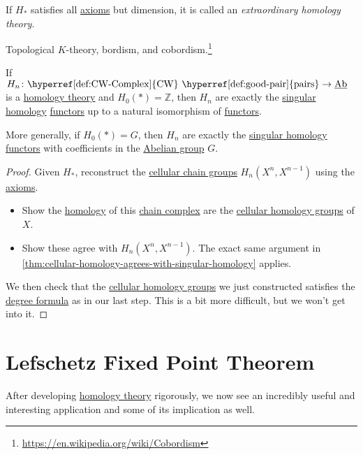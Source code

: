 \begin{definition}\label{def:extraordinary-homology-theory}
	If \(H_\ast\) satisfies all \hyperref[def:homology-theory]{axioms} but dimension, it is called an \emph{extraordinary homology theory}.
\end{definition}
\begin{eg}
	Topological \(K\)-theory, bordism, and cobordism.\footnote{\url{https://en.wikipedia.org/wiki/Cobordism}}
\end{eg}

\begin{theorem}\label{thm:characterization-of-singular-homology}
	If \(H_n \colon \text{\hyperref[def:CW-Complex]{CW} \hyperref[def:good-pair]{pairs}} \to \underline{\mathrm{Ab}}\) is a
	\hyperref[def:homology-theory]{homology theory} and \(H_0(\ast) = \mathbb{Z}\), then \(H_n\) are exactly
	the \hyperref[def:singular-homology-group]{singular homology} \hyperref[def:functor]{functors} up to a natural isomorphism of \hyperref[def:functor]{functors}.

	More generally, if \(H_0(\ast) = G\), then \(H_n\) are exactly the
	\hyperref[def:singular-homology-group]{singular homology} \hyperref[def:functor]{functors} with coefficients in the
	\hyperref[def:Abelian-group]{Abelian group} \(G\).
\end{theorem}
\begin{proof}
	Given \(H_\ast\), reconstruct the \hyperref[def:cellular-chain-complex]{cellular chain groups} \(H_n(X^n, X^{n-1})\) using the
	\hyperref[def:homology-theory]{axioms}.
	\begin{itemize}
		\item Show the \hyperref[def:homology-theory]{homology} of this \hyperref[def:chain-complex]{chain complex} are
		      the \hyperref[def:cellular-homology-group]{cellular homology groups} of \(X\).
		\item Show these agree with \(H_{n} (X^n, X^{n-1})\). The exact same argument in \autoref{thm:cellular-homology-agrees-with-singular-homology} applies.
	\end{itemize}

	We then check that the \hyperref[def:cellular-homology-group]{cellular homology groups} we just constructed satisfies the
	\hyperref[thm:calculation-with-local-degree]{degree formula} as in our last step. This is a bit more difficult, but we won't get into it.
\end{proof}

\chapter{Lefschetz Fixed Point Theorem}
After developing \hyperref[def:homology-theory]{homology theory} rigorously, we now see an incredibly useful and interesting application and some of its
implication as well.


